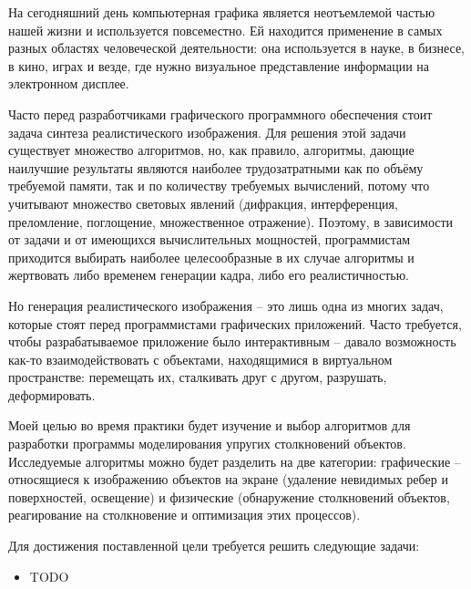 
На сегодняшний день компьютерная графика является неотъемлемой частью
нашей жизни и используется повсеместно. Ей находится применение в самых разных
областях человеческой деятельности: она используется в науке, в бизнесе, в
кино, играх и везде, где нужно визуальное представление информации на
электронном дисплее.

Часто перед разработчиками графического программного обеспечения
стоит задача синтеза реалистического изображения. Для решения этой задачи
существует множество алгоритмов, но, как правило, алгоритмы, дающие наилучшие
результаты являются наиболее трудозатратными как по объёму требуемой памяти,
так и по количеству требуемых вычислений, потому что учитывают множество
световых явлений (дифракция, интерференция, преломление, поглощение,
множественное отражение). Поэтому, в зависимости от задачи и от имеющихся
вычислительных мощностей, программистам приходится выбирать наиболее
целесообразные в их случае алгоритмы и жертвовать либо временем генерации
кадра, либо его реалистичностью.

Но генерация реалистического изображения -- это лишь одна из многих
задач, которые стоят перед программистами графических приложений. Часто
требуется, чтобы разрабатываемое приложение было интерактивным -- давало
возможность как-то взаимодействовать с объектами, находящимися в виртуальном
пространстве: перемещать их, сталкивать друг с другом, разрушать,
деформировать.

Моей целью во время практики будет изучение и выбор алгоритмов для
разработки программы моделирования упругих столкновений объектов. Исследуемые
алгоритмы можно будет разделить на две категории: графические -- относящиеся к
изображению объектов на экране (удаление невидимых ребер и поверхностей,
освещение) и физические (обнаружение столкновений объектов, реагирование на
столкновение и оптимизация этих процессов). %

Для достижения поставленной цели требуется решить следующие задачи:

\begin{itemize}
    \item TODO
\end{itemize}
